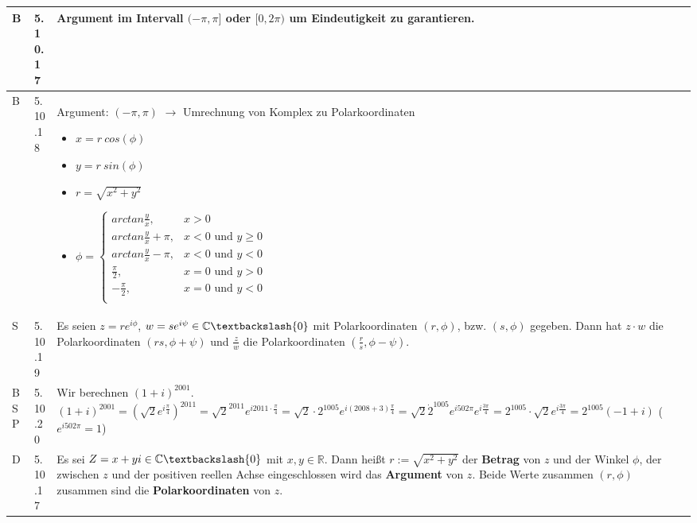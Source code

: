     \begin{longtable}{p{0.75cm} p{1cm} p{16cm}}
        \toprule
        B   & 5.10.17&  Argument im Intervall $(-\pi, \pi]$ oder $[0, 2\pi)$ um Eindeutigkeit zu garantieren. \\
        \midrule
        B   & 5.10.18&  Argument: $(-\pi, \pi)$ $\rightarrow$ Umrechnung von Komplex zu Polarkoordinaten
                        \begin{itemize}[topsep=-0.5cm]
                            \item[] $x = r~cos(\phi)$
                            \item[] $y= r~sin(\phi)$ 
                            \item[] $r = \sqrt{x^2+y^2}$
                            \item[] $\phi = \begin{cases}
                                            arctan\frac{y}{x}, & x > 0 \\
                                            arctan\frac{y}{x}+\pi, & x<0 \text{ und } y \geq 0 \\
                                            arctan\frac{y}{x}-\pi, & x<0 \text{ und } y < 0 \\
                                            \frac{\pi}{2}, & x=0 \text{ und } y > 0 \\
                                            -\frac{\pi}{2}, & x=0 \text{ und } y < 0 \\
                                            \end{cases}$   
                        \end{itemize}\\
        \midrule
        S   & 5.10.19&  Es seien $z=re^{i\phi}$, $w=se^{i\psi} \in \mathbb{C} \textbackslash \{0\}$ mit Polarkoordinaten $(r,\phi)$, bzw. $(s,\phi)$
                        gegeben. Dann hat $z \cdot w$ die Polarkoordinaten $(rs, \phi + \psi)$ und $\frac{z}{w}$ die Polarkoordinaten
                        $(\frac{r}{s}, \phi - \psi)$. \\
        \midrule
        BSP & 5.10.20&  Wir berechnen $(1+i)^{2001}$. \hfill \break
                        $(1+i)^{2001} = (\sqrt{2}e^{i\frac{\pi}{4}})^{2011} = \sqrt{2}^{2011} e^{i2011\cdot \frac{\pi}{4}} =
                        \sqrt{2} \cdot 2^{1005} e^{i(2008+3)\frac{\pi}{4}} = \sqrt{2} \dot 2^1005 e^{i502\pi}e^{i\frac{3\pi}{4}}= 
                        2^{1005} \cdot \sqrt{2} e^{i\frac{3\pi}{4}} = 2^{1005} (-1+i)$ ($e^{i502\pi} =1$)\\
        \midrule
        D   & 5.10.17&  Es sei $Z = x + yi \in \mathbb{C} \textbackslash \{0\}$ mit $x,y \in \mathbb{R}$. Dann heißt $r:= \sqrt{x^2+y^2}$ der \textbf{Betrag}
                        von $z$ und der Winkel $\phi$, der zwischen $z$ und der positiven reellen Achse eingeschlossen wird das \textbf{Argument} von $z$.
                        Beide Werte zusammen $(r,\phi)$ zusammen sind die \textbf{Polarkoordinaten} von $z$.\\

        \bottomrule

    \end{longtable}

